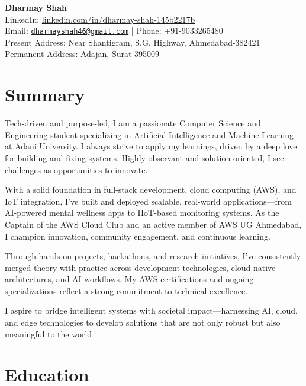 \documentclass[10pt,a4paper]{article}
\begin{document}
\begin{center}
    {\Large \textbf{Dharmay Shah}} \\[1pt]
    LinkedIn: \href{https://www.linkedin.com/in/dharmay-shah-145b2217b/}{linkedin.com/in/dharmay-shah-145b2217b} \\[1pt]
    Email: \href{mailto:dharmayshah46@gmail.com}{\texttt{dharmayshah46@gmail.com}} \quad | \quad Phone: +91-9033265480\\[1pt]
    Present Address: Near Shantigram, S.G. Highway, Ahmedabad-382421 \\
    Permanent Address: Adajan, Surat-395009
\end{center}

\section*{Summary}
Tech-driven and purpose-led, I am a passionate Computer Science and Engineering student specializing in Artificial Intelligence and Machine Learning at Adani University. I always strive to apply my learnings, driven by a deep love for building and fixing systems. Highly observant and solution-oriented, I see challenges as opportunities to innovate.

With a solid foundation in full-stack development, cloud computing (AWS), and IoT integration, I’ve built and deployed scalable, real-world applications—from AI-powered mental wellness apps to IIoT-based monitoring systems. As the Captain of the AWS Cloud Club and an active member of AWS UG Ahmedabad, I champion innovation, community engagement, and continuous learning.

Through hands-on projects, hackathons, and research initiatives, I’ve consistently merged theory with practice across development technologies, cloud-native architectures, and AI workflows. My AWS certifications and ongoing specializations reflect a strong commitment to technical excellence.

I aspire to bridge intelligent systems with societal impact—harnessing AI, cloud, and edge technologies to develop solutions that are not only robust but also meaningful to the world

\section*{Education}
\end{document}
